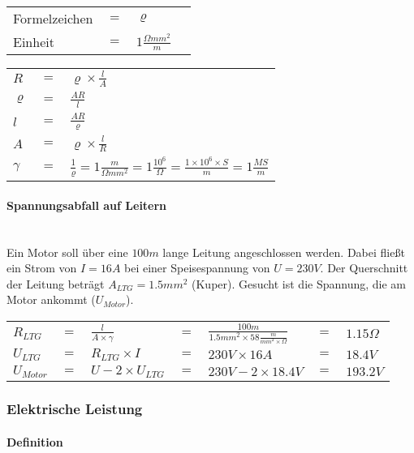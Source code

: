 \begin{tabular}{llll}
Formelzeichen	& $=$ & $\varrho$ &\\
Einheit			& $=$ & $1\frac{\Omega mm^2}{m	}$ &\\
\end{tabular}\newline

\begin{tabular}{lll}
$R$			& $=$ & $\varrho\times\frac{l}{A}$\\
$\varrho$	& $=$ & $\frac{AR}{l}$\\
$l$			& $=$ & $\frac{AR}{\varrho}$\\
$A$			& $=$ & $\varrho\times\frac{l}{R}$\\
$\gamma$		& $=$ & $\frac{1}{\varrho} = 1\frac{m}{\Omega mm^2} = 1\frac{10^6}{\Omega} = \frac{1\times 10^6\times S}{m} = 1\frac{MS}{m}$
\end{tabular}

		\paragraph{Spannungsabfall auf Leitern}~\\
		
\noindent Ein Motor soll über eine $100m$ lange Leitung angeschlossen werden. Dabei fließt ein Strom von $I = 16A$ bei einer Speisespannung von $U = 230V$. Der Querschnitt der Leitung beträgt $A_{LTG} = 1.5mm^2$ (Kuper). Gesucht ist die Spannung, die am Motor ankommt ($U_{Motor}$).\\

\begin{tabular}{lllllll}
$R_{LTG}$ & $=$ & $\frac{l}{A\times\gamma}$ & $=$ & $\frac{100m}{1.5mm^2\times 58\frac{m}{mm^2\times\Omega}}$ & $=$ & $1.15\Omega$\\
$U_{LTG}$ & $=$ & $R_{LTG}\times I$ & $=$ & $230V \times 16A$ & $=$ & $18.4V$\\
$U_{Motor}$ & $=$ & $U - 2\times U_{LTG}$ & $=$ & $230V - 2\times 18.4V$ & $=$ & $193.2V$ \\
\end{tabular}

	\subsubsection{Elektrische Leistung}
		\paragraph{Definition}~\\
